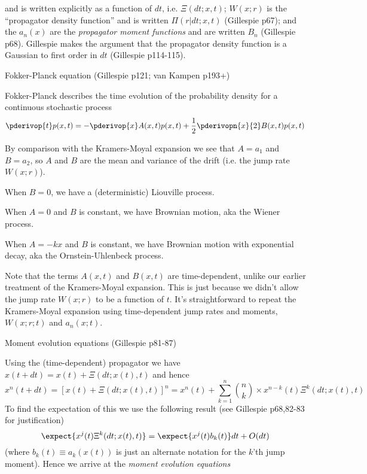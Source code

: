 \documentclass{beamer}
\begin{document}
\begin{frame}{}
and is written explicitly as a function of $dt$, i.e. $\Xi(dt;x,t)$;
$W(x;r)$ is the ``propagator density function'' and is written $\Pi(r|dt;x,t)$ (Gillespie p67);
and the $a_n(x)$ are the {\em propagator moment functions} and are written $B_n$ (Gillespie p68).
Gillespie makes the argument that the propagator density function is a Gaussian to first order in $dt$ (Gillespie p114-115).
 \iteme
\item Fokker-Planck equation (Gillespie p121; van Kampen p193+)
 \itemb
 \item Fokker-Planck describes the time evolution of the probability density for a continuous stochastic process
\[
\pderivop{t} p(x,t) = -\pderivop{x} A(x,t)p(x,t) + \frac{1}{2} \pderivopn{x}{2} B(x,t)p(x,t)
\]
 \item By comparison with the Kramers-Moyal expansion we see that $A=a_1$ and $B=a_2$,
so $A$ and $B$ are the mean and variance of the drift (i.e. the jump rate $W(x;r)$).
  \itemb
  \item When $B=0$, we have a (deterministic) Liouville process.
  \item When $A=0$ and $B$ is constant, we have Brownian motion, aka the Wiener process.
  \item When $A=-kx$ and $B$ is constant, we have Brownian motion with exponential decay, aka the Ornstein-Uhlenbeck process.
  \iteme
 \item Note that the terms $A(x,t)$ and $B(x,t)$ are time-dependent, unlike our earlier treatment of the Kramers-Moyal expansion.
This is just because we didn't allow the jump rate $W(x;r)$ to be a function of $t$.
It's straightforward to repeat the Kramers-Moyal expansion using time-dependent jump rates and moments, $W(x;r;t)$ and $a_n(x;t)$.
 \iteme
\item Moment evolution equations (Gillespie p81-87)
 \itemb
 \item Using the (time-dependent) propagator we have $x(t+dt) = x(t) + \Xi(dt;x(t),t)$ and hence
\[
x^n(t+dt) = \left[ x(t) + \Xi(dt;x(t),t) \right]^n = x^n(t) + \sum_{k=1}^n \binom{n}{k} \times x^{n-k}(t) \Xi^k(dt;x(t),t)
\]
To find the expectation of this we use the following result (see Gillespie p68,82-83 for justification)
\begin{equation}
\label{eq:PropagatorMoments}
\expect{x^j(t) \Xi^k(dt;x(t),t)} = \expect{x^j(t) b_k(t)} dt + O(dt)
\end{equation}
(where $b_k(t) \equiv a_k(x(t))$ is just an alternate notation for the $k$'th jump moment).
Hence we arrive at the {\em moment evolution equations}

\end{frame}
\end{document}
